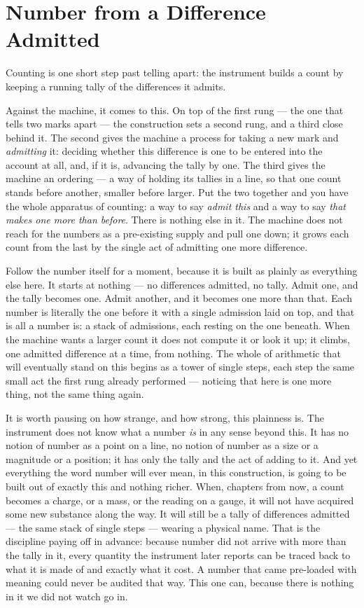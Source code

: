 \section{Number from a Difference Admitted}

Counting is one short step past telling apart: the instrument builds a count by keeping a
running tally of the differences it admits.

Against the machine, it comes to this. On top of the first rung --- the one that tells two marks apart --- the
construction sets a second rung, and a third close behind it. The second gives the machine a process for taking a
new mark and \emph{admitting} it: deciding whether this difference is one to be entered into the account at all,
and, if it is, advancing the tally by one. The third gives the machine an ordering --- a way of holding its
tallies in a line, so that one count stands before another, smaller before larger. Put the two together and you
have the whole apparatus of counting: a way to say \emph{admit this} and a way to say \emph{that makes one more
than before}. There is nothing else in it. The machine does not reach for the numbers as a pre-existing supply
and pull one down; it grows each count from the last by the single act of admitting one more difference.

Follow the number itself for a moment, because it is built as plainly as everything else here. It starts at
nothing --- no differences admitted, no tally. Admit one, and the tally becomes one. Admit another, and it
becomes one more than that. Each number is literally the one before it with a single admission laid on top, and
that is all a number is: a stack of admissions, each resting on the one beneath. When the machine wants a larger
count it does not compute it or look it up; it climbs, one admitted difference at a time, from nothing. The whole
of arithmetic that will eventually stand on this begins as a tower of single steps, each step the same small act
the first rung already performed --- noticing that here is one more thing, not the same thing again.

It is worth pausing on how strange, and how strong, this plainness is. The instrument does not know what a number
\emph{is} in any sense beyond this. It has no notion of number as a point on a line, no notion of number as a
size or a magnitude or a position; it has only the tally and the act of adding to it. And yet everything the word
number will ever mean, in this construction, is going to be built out of exactly this and nothing richer. When, chapters
from now, a count becomes a charge, or a mass, or the reading on a gauge, it will not have acquired some new
substance along the way. It will still be a tally of differences admitted --- the same stack of single steps ---
wearing a physical name. That is the discipline paying off in advance: because number did not arrive with more
than the tally in it, every quantity the instrument later reports can be traced back to what it is made of and
exactly what it cost. A number that came pre-loaded with meaning could never be audited
that way. This one can, because there is nothing in it we did not watch go in.

